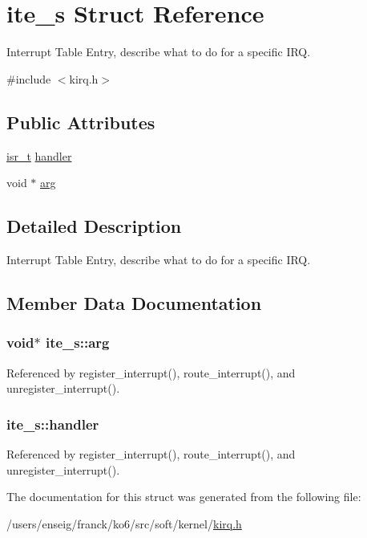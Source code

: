 \hypertarget{structite__s}{\section{ite\-\_\-s Struct Reference}
\label{structite__s}
}


Interrupt Table Entry, describe what to do for a specific I\-R\-Q.  




{\ttfamily \#include $<$kirq.\-h$>$}

\subsection*{Public Attributes}
\begin{DoxyCompactItemize}
\item 
\hyperlink{kirq_8h_a6c476c213249d7236d7888257e71628d}{isr\-\_\-t} \hyperlink{structite__s_a1fb9e01b3558413d6d403a33c563dec2}{handler}
\item 
void $\ast$ \hyperlink{structite__s_ae704d1dffab809cd86efd3f6bed58db1}{arg}
\end{DoxyCompactItemize}


\subsection{Detailed Description}
Interrupt Table Entry, describe what to do for a specific I\-R\-Q. 

\subsection{Member Data Documentation}
\hypertarget{structite__s_ae704d1dffab809cd86efd3f6bed58db1}{
\subsubsection[{arg}]{\setlength{\rightskip}{0pt plus 5cm}void$\ast$ ite\-\_\-s\-::arg}}\label{structite__s_ae704d1dffab809cd86efd3f6bed58db1}


Referenced by register\-\_\-interrupt(), route\-\_\-interrupt(), and unregister\-\_\-interrupt().

\hypertarget{structite__s_a1fb9e01b3558413d6d403a33c563dec2}{
\subsubsection[{handler}]{ ite\-\_\-s\-::handler}}\label{structite__s_a1fb9e01b3558413d6d403a33c563dec2}


Referenced by register\-\_\-interrupt(), route\-\_\-interrupt(), and unregister\-\_\-interrupt().



The documentation for this struct was generated from the following file\-:\begin{DoxyCompactItemize}
\item 
/users/enseig/franck/ko6/src/soft/kernel/\hyperlink{kirq_8h}{kirq.\-h}\end{DoxyCompactItemize}
